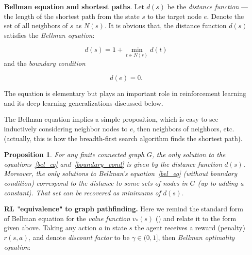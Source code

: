 \documentclass[reqno,11pt]{amsart}
\newtheorem{proposition}[Def]{Proposition}
\begin{document}
{\bf Bellman equation and shortest paths}. Let $d(s)$ be the \textit{distance function} — the length of the shortest path from the state $s$ to the target node $e$. Denote the set of all neighbors of $s$ as $N(s)$. 
It is obvious that, the distance function $d(s)$ satisfies the \textit{Bellman equation}: 

\begin{equation}
\label{bel_eq}
d(s) = 1 + \min\limits_{t \in N(s)} d(t)  
\end{equation}
and the \textit{boundary condition} 

\begin{equation}
\label{boundary_cond}
d(e) = 0.
\end{equation}

The equation is elementary but plays an important role in reinforcement learning and its deep learning generalizations discussed below.

The Bellman equation implies a simple proposition, which is easy to see inductively considering neighbor nodes to $e$, then neighbors of neighbors, etc. (actually, this is how the breadth-first search algorithm finds the shortest path).

\begin{proposition}
    For any finite connected graph $G$, the only solution to the equations~\eqref{bel_eq} and~\eqref{boundary_cond} is given by the distance function $d(s)$. Moreover, the only solutions to Bellman's equation~\eqref{bel_eq} (without boundary condition) correspond to the distance to some sets of nodes in $G$ (up to adding a constant). That set can be recovered as minimums of $d(s)$. 
\end{proposition}


{\bf RL "equivalence" to graph pathfinding.} 
Here we remind the standard form of Bellman equation for the \textit{value function} $v_*(s)$  (\cite[p.62]{sutton2018})  and relate it to the form given above.  Taking any action $a$ in state $s$ the agent receives a reward (penalty) $r(s, a)$,  and denote \textit{ discount factor} to be  $\gamma \in(0,1]$, then   \textit{Bellman optimality equation}:

\end{document}
